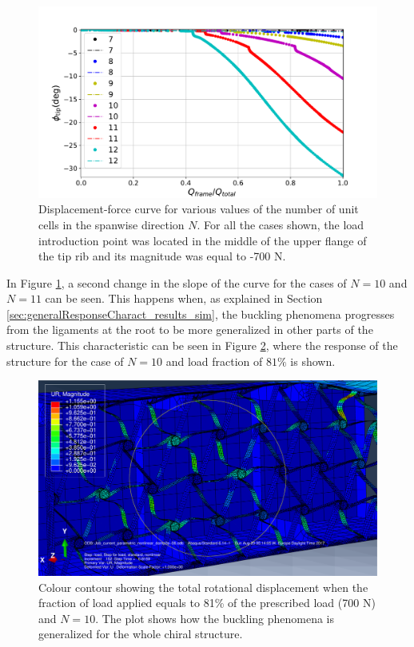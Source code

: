     \begin{figure}[!htpb] %
      \centering
      \includegraphics[width=0.8 \textwidth]{figures/result-sim/N/force_displacement-far}
      \caption[Displacement-force curve for various values of the number of unit cells in the spanwise direction]{Displacement-force curve for various values of the number of unit cells in the spanwise direction $N$. For all the cases shown, the load introduction point was located in the middle of the upper flange of the tip rib and its magnitude was equal to -700 N.}\label{fig:forceDisplacement-far-N}
    \end{figure}

    In Figure \ref{fig:forceDisplacement-far-N}, a second change in the slope of the curve for the cases of $N = 10$ and $N = 11$ can be seen. This happens when, as explained in Section \ref{sec:generalResponseCharact_results_sim}, the buckling phenomena progresses from the ligaments at the root to be more generalized in other parts of the structure. This characteristic can be seen in Figure \ref{fig:N10-UR}, where the response of the structure for the case of $N = 10$ and load fraction of $81\%$ is shown.

    \begin{figure}[!htpb] %
      \centering
      \includegraphics[width=0.8 \textwidth]{figures/result-sim/N/10}
      \caption[Colour contour showing the total rotational displacement when the fraction of load applied equals to 81\% of the prescribed load (700 N) and $N = 10$]{Colour contour showing the total rotational displacement when the fraction of load applied equals to 81\% of the prescribed load (700 N) and $N = 10$. The plot shows how the buckling phenomena is generalized for the whole chiral structure.}\label{fig:N10-UR}
    \end{figure}


